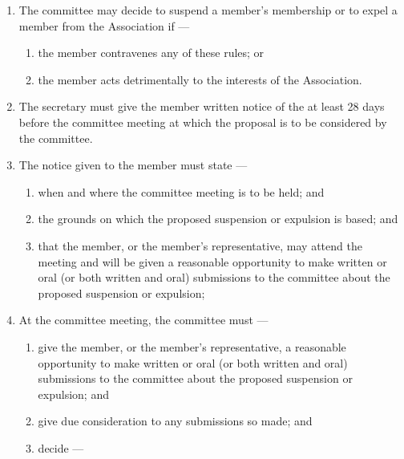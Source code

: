 \documentclass[../constitution.tex]{subfiles}
\begin{document}
\begin{enumerate}

\item The committee may decide to suspend a member's membership or to expel a member from the Association if ---

  \begin{enumerate}
  
  \item the member contravenes any of these rules; or
  \item the member acts detrimentally to the interests of the Association.
  \end{enumerate}
\item The secretary must give the member written notice of the  at least 28 days before the committee meeting at which the proposal is to be considered by the committee.
\item The notice given to the member must state ---

  \begin{enumerate}
  
  \item when and where the committee meeting is to be held; and
  \item the grounds on which the proposed suspension or expulsion is based; and
  \item that the member, or the member's representative, may attend the meeting and will be given a reasonable opportunity to make written or oral (or both written and oral) submissions to the committee about the proposed suspension or expulsion;
  \end{enumerate}
\item At the committee meeting, the committee must ---

  \begin{enumerate}
  
  \item give the member, or the member's representative, a reasonable opportunity to make written or oral (or both written and oral) submissions to the committee about the proposed suspension or expulsion; and
  \item give due consideration to any submissions so made; and
  \item decide ---

    \begin{enumerate}
    

\end{enumerate}
\end{enumerate}
\end{enumerate}
\end{document}
